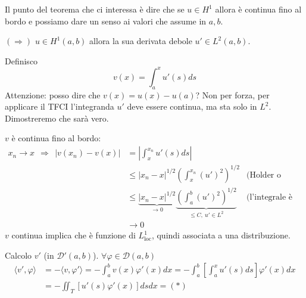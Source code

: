 \documentclass[10pt,a4paper,twoside,openright]{book}
\begin{document}
Il punto del teorema che ci interessa è dire che se $u\in H^{1}$ allora è continua fino al bordo e possiamo dare un senso ai valori che assume in $a,b$.
\begin{dimostrazione}
	$( \Rightarrow )$ $u\in H^{1}( a,b)$ allora la sua derivata debole $u'\in L^{2}( a,b)$.
	
	Definisco
	\begin{equation*}
		v( x) =\int ^{x}_{a} u'( s) ds
	\end{equation*}
	Attenzione: posso dire che $v( x) =u( x) -u( a)$? Non per forza, per applicare il TFCI l'integranda $u'$ deve essere continua, ma sta solo in $L^{2}$. Dimostreremo che sarà vero.
	
	$v$ è continua fino al bordo:
	\begin{align*}
		x_{n}\rightarrow x\ \ \Rightarrow \ \ | v( x_{n}) -v( x)| & =\left| \int ^{x_{n}}_{x} u'( s) ds\right|                                                                                                 &                                  \\
		                                                          & \leqslant | x_{n} -x| ^{1/2}\left(\int ^{x_{n}}_{x}( u')^{2}\right)^{1/2}                                                                  & \text{(Holder o Cauchy-Schwarz)} \\
		                                                          & \leqslant \underbrace{| x_{n} -x| ^{1/2}}_{\rightarrow 0}\underbrace{\left(\int ^{b}_{a}( u')^{2}\right)^{1/2}}_{\leqslant C,\ u'\in L^{2}} & \text{(l'integrale è positivo)} \\
		                                                          & \rightarrow 0                                                                                                                              &                                  
	\end{align*}
	$v$ continua implica che è funzione di $L^{1}_{\mathrm{loc}}$, quindi associata a una distribuzione.
	
	Calcolo $v'$ (in $\mathcal{D} '( a,b)$). $\forall \varphi \in \mathcal{D}( a,b)$
	\begin{align*}
		\langle v',\varphi \rangle & =-\langle v,\varphi '\rangle =-\int ^{b}_{a} v( x) \varphi '( x) dx=-\int ^{b}_{a}\left[\int ^{x}_{a} u'( s) ds\right] \varphi '( x) dx \\
		                           & =-\iint _{T}[ u'( s) \varphi '( x)] dsdx=( *)                                                                                           
	\end{align*}



\end{dimostrazione}
\end{document}
